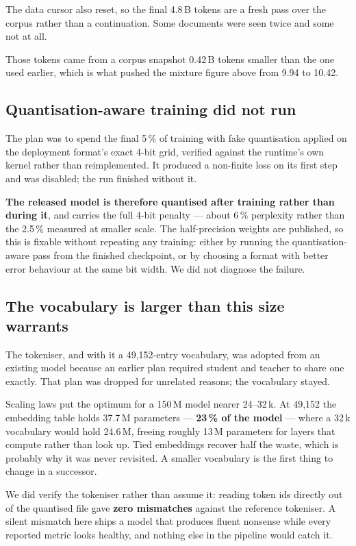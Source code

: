 \documentclass[conference]{IEEEtran}
\begin{document}
The data cursor also reset, so the final 4.8\,B tokens are a fresh pass over the
corpus rather than a continuation. Some documents were seen twice and some not
at all.

Those tokens came from a corpus snapshot 0.42\,B tokens smaller than the one used
earlier, which is what pushed the mixture figure above from 9.94 to 10.42.

\subsection{Quantisation-aware training did not run}
\label{sec:qat}

The plan was to spend the final 5\,\% of training with fake quantisation applied
on the deployment format's exact 4-bit grid, verified against the runtime's own
kernel rather than reimplemented. It produced a non-finite loss on its first
step and was disabled; the run finished without it.

\textbf{The released model is therefore quantised after training rather than
during it}, and carries the full 4-bit penalty --- about 6\,\% perplexity rather
than the 2.5\,\% measured at smaller scale. The half-precision weights are
published, so this is fixable without repeating any training: either by running
the quantisation-aware pass from the finished checkpoint, or by choosing a
format with better error behaviour at the same bit width. We did not diagnose
the failure.

\subsection{The vocabulary is larger than this size warrants}

The tokeniser, and with it a 49{,}152-entry vocabulary, was adopted from an
existing model because an earlier plan required student and teacher to share
one exactly. That plan was dropped for unrelated reasons; the vocabulary stayed.

Scaling laws put the optimum for a 150\,M model nearer 24--32\,k. At 49{,}152 the
embedding table holds 37.7\,M parameters --- \textbf{23\,\% of the model} --- where
a 32\,k vocabulary would hold 24.6\,M, freeing roughly 13\,M parameters for
layers that compute rather than look up. Tied embeddings recover half the waste,
which is probably why it was never revisited. A smaller vocabulary is the first
thing to change in a successor.

We did verify the tokeniser rather than assume it: reading token ids directly
out of the quantised file gave \textbf{zero mismatches} against the reference
tokeniser. A silent mismatch here ships a model that produces fluent nonsense
while every reported metric looks healthy, and nothing else in the pipeline
would catch it.
\end{document}
